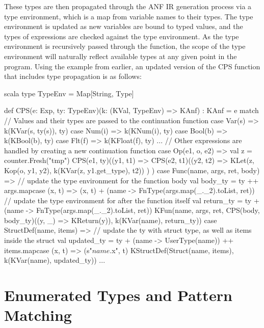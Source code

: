These types are then propagated through the ANF IR generation process via a type environment, which
is a map from variable names to their types. The type environment is updated as new variables are
bound to typed values, and the types of expressions are checked against the type environment. As the
type environment is recursively passed through the function, the scope of the type environment will
naturally reflect available types at any given point in the program. Using the example from earlier,
an updated version of the CPS function that includes type propagation is as follows:

\begin{code}{scala}
    type TypeEnv = Map[String, Type]

    def CPS(e: Exp, ty: TypeEnv)(k: (KVal, TypeEnv) => KAnf) : KAnf = e match {
        // Values and their types are passed to the continuation function
        case Var(s) => k(KVar(s, ty(s)), ty)
        case Num(i) => k(KNum(i), ty)
        case Bool(b) => k(KBool(b), ty)
        case Flt(f) => k(KFloat(f), ty)
        ...
        // Other expressions are handled by creating a new continuation function
        case Op(e1, o, e2) => {
            val z = counter.Fresh("tmp")
            CPS(e1, ty)((y1, t1) =>
                CPS(e2, t1)((y2, t2) =>
                    KLet(z, Kop(o, y1, y2), k(KVar(z, y1.get_type), t2))
                )
            )
        }
        case Func(name, args, ret, body) => {
            // update the type environment for the function body
            val body_ty = ty
                ++ args.map{case (x, t) => (x, t)}
                + (name -> FnType(args.map(_._2).toList, ret))
            // update the type environment for after the function itself
            val return_ty = ty
                + (name -> FnType(args.map(_._2).toList, ret))
            KFun(name, args, ret, CPS(body, body_ty)((y, _) => KReturn(y)), k(KVar(name), return_ty))
        }
        case StructDef(name, items) =>
            // update the ty with struct type, as well as items inside the struct
            val updated_ty = ty
                + (name -> UserType(name))
                ++ items.map{case (x, t) => (s"$name.$x", t)}
            KStructDef(Struct(name, items), k(KVar(name), updated_ty))
        ...
    }
\end{code}



\section{Enumerated Types and Pattern Matching}

